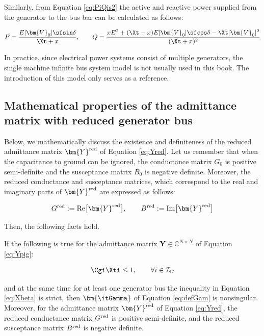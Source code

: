 \documentclass[graybox, envcountchap]{svmult}
\begin{document}
Similarly, from Equation \ref{eq:PiQis2} the active and reactive power supplied
from the generator to the bus bar can be calculated as follows:

\[
  P=\frac{
  E|\bm{V}_0|\sfsin\delta
  }{
  \Xt + x
  }
  ,\qquad
  Q=
  \frac{
  x E^2 + (\Xt - x )E|\bm{V}_0|\sfcos\delta
  - \Xt |\bm{V}_0|^2
  }{
  ( \Xt + x )^2
  }
\]

In practice, since electrical power systems consist of multiple generators, the 
single machine infinite bus system model is not usually used in this book. The
introduction of this model only serves as a reference.

\subsection{Mathematical properties of the admittance matrix with reduced
generator bus}

Below, we mathematically discuss the existence and definiteness of the reduced
admittance matrix $\bm{Y}^{\rm red}$ of Equation \ref{eq:Yred}. Let us remember
that when the capacitance to ground can be ignored, the conductance matrix $G_0$
is positive semi-definite and the susceptance matrix $B_0$ is negative definite.
Moreover, the reduced conductance and susceptance matrices, which correspond to the
real and imaginary parts of $\bm{Y}^{\rm red}$ are expressed as follows:

\begin{equation}\label{eq:GredBred}
  G^{\rm red} :=\operatorname{Re}\bigl[\bm{Y}^{\rm red}\bigr] ,\qquad
  B^{\rm red} :=\operatorname{Im}\bigl[\bm{Y}^{\rm red}\bigr] 
\end{equation}

Then, the following facts hold.

\begin{theorem}
\label{thm:redadmat}

If the following is true for the admittance matrix $\bm{Y}\in
\mathbb{C}^{N\times N}$ of Equation \ref{eq:Ypig}:

\begin{equation}\label{eq:Xbeta}
  \Cgi \Xti \leq 1
  ,\qquad \forall i \in \mathcal{I}_G
\end{equation}

and at the same time for at least one generator bus the inequality in Equation
\ref{eq:Xbeta} is strict, then  $\bm{\itGamma}$ of Equation \ref{eq:defGam} is
nonsingular. Moreover, for the admittance matrix $\bm{Y}^{\rm red}$ of Equation
\ref{eq:Yred}, the reduced conductance matrix $G^{\rm red}$ is positive
semi-definite, and the reduced susceptance matrix $B^{\rm red}$ is negative
definite.
\end{theorem}
\end{document}

